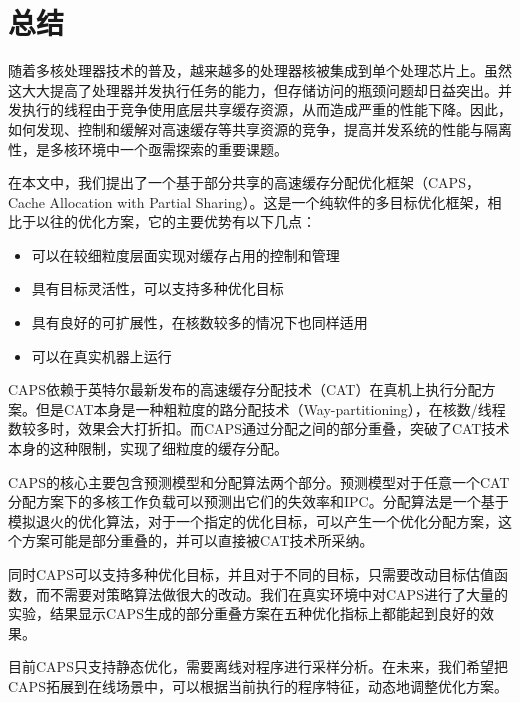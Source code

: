 
\chapter{总结} \label{chap:conclusion}

随着多核处理器技术的普及，越来越多的处理器核被集成到单个处理芯片上。虽然这大大提高了处理器并发执行任务的能力，但存储访问的瓶颈问题却日益突出。并发执行的线程由于竞争使用底层共享缓存资源，从而造成严重的性能下降。因此，如何发现、控制和缓解对高速缓存等共享资源的竞争，提高并发系统的性能与隔离性，是多核环境中一个亟需探索的重要课题。

在本文中，我们提出了一个基于部分共享的高速缓存分配优化框架（CAPS，Cache Allocation with Partial Sharing）。这是一个纯软件的多目标优化框架，相比于以往的优化方案，它的主要优势有以下几点：

\begin{itemize}
    \item 可以在较细粒度层面实现对缓存占用的控制和管理
    \item 具有目标灵活性，可以支持多种优化目标
    \item 具有良好的可扩展性，在核数较多的情况下也同样适用
    \item 可以在真实机器上运行
\end{itemize}

CAPS依赖于英特尔最新发布的高速缓存分配技术（CAT）在真机上执行分配方案。但是CAT本身是一种粗粒度的路分配技术（Way-partitioning），在核数/线程数较多时，效果会大打折扣。而CAPS通过分配之间的部分重叠，突破了CAT技术本身的这种限制，实现了细粒度的缓存分配。

CAPS的核心主要包含预测模型和分配算法两个部分。预测模型对于任意一个CAT分配方案下的多核工作负载可以预测出它们的失效率和IPC。分配算法是一个基于模拟退火的优化算法，对于一个指定的优化目标，可以产生一个优化分配方案，这个方案可能是部分重叠的，并可以直接被CAT技术所采纳。

同时CAPS可以支持多种优化目标，并且对于不同的目标，只需要改动目标估值函数，而不需要对策略算法做很大的改动。我们在真实环境中对CAPS进行了大量的实验，结果显示CAPS生成的部分重叠方案在五种优化指标上都能起到良好的效果。

目前CAPS只支持静态优化，需要离线对程序进行采样分析。在未来，我们希望把CAPS拓展到在线场景中，可以根据当前执行的程序特征，动态地调整优化方案。
